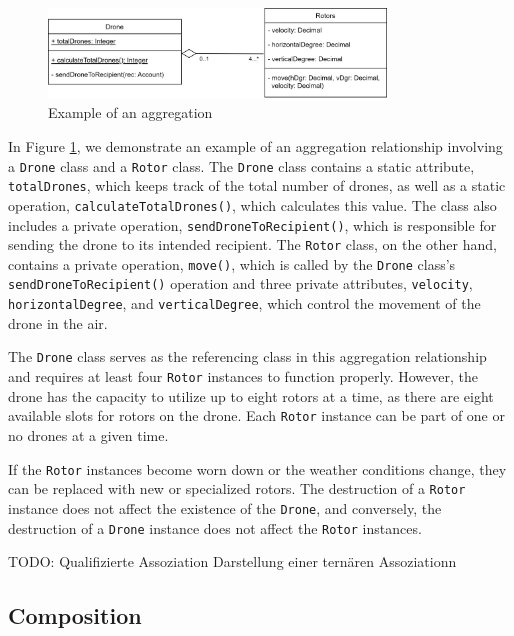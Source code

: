 \documentclass[
	12pt,
    a4paper,
    egregdoesnotlikesansseriftitles, %
    toc=chapterentrywithdots,
    oneside, openany,
    titlepage,
    parskip=half,
    headings=normal,  %
    listof=totoc,
    bibliography=totoc,
    index=totoc,
    captions=tableheading,  %
    listof=flat,
    numbers=noenddot, %
    final]
    {scrbook}
\begin{document}
\begin{figure}[h]
	\centering
	\includegraphics[width=0.8\textwidth]{figures/aggr_comp/aggr.jpg}
	\caption[Example aggregation]{Example of an aggregation}
	\label{fig:aggregation_example} 
\end{figure}



In Figure \ref{fig:aggregation_example}, we demonstrate an example of an aggregation relationship involving a \texttt{Drone} class and a \texttt{Rotor} class. The \texttt{Drone} class contains a static attribute, \texttt{totalDrones}, which keeps track of the total number of drones, as well as a static operation, \texttt{calculateTotalDrones()}, which calculates this value. The class also includes a private operation, \texttt{sendDroneToRecipient()}, which is responsible for sending the drone to its intended recipient. The \texttt{Rotor} class, on the other hand, contains a private operation, \texttt{move()}, which is called by the \texttt{Drone} class's \texttt{sendDroneToRecipient()} operation and three private attributes, \texttt{velocity}, \texttt{horizontalDegree}, and \texttt{verticalDegree}, which control the movement of the drone in the air. \cite[p. 153]{uml}

The \texttt{Drone} class serves as the referencing class in this aggregation relationship and requires at least four \texttt{Rotor} instances to function properly. However, the drone has the capacity to utilize up to eight rotors at a time, as there are eight available slots for rotors on the drone. Each \texttt{Rotor} instance can be part of one or no drones at a given time.

If the \texttt{Rotor} instances become worn down or the weather conditions change, they can be replaced with new or specialized rotors. The destruction of a \texttt{Rotor} instance does not affect the existence of the \texttt{Drone}, and conversely, the destruction of a \texttt{Drone} instance does not affect the \texttt{Rotor} instances.

TODO: Qualifizierte Assoziation
   Darstellung einer ternären Assoziationn


\subsection{Composition}
\end{document}
